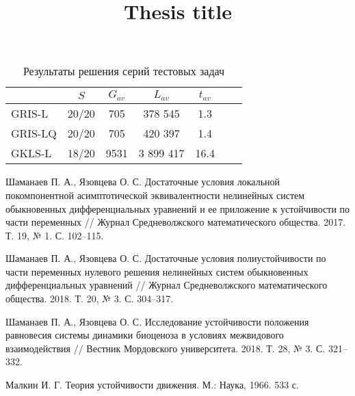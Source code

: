 \documentclass[11pt, oneside, a4paper]{article}
\begin{document}
\begin{table}[ht]
	\caption{Результаты решения серий тестовых задач}
	\label{tab1}
	\begin{center}
		\begin{tabular}{ l c c c c c c } \hline
		 & $S$ &  $G_{av}$ &  $L_{av}$ & $t_{av}$ \\
    \hline
		GRIS-L & 20/20  & 705 &  378 545 & 1.3 \\
		GRIS-LQ & 20/20 & 705 &  420 397 & 1.4 \\
		GKLS-L & 18/20 & 9531 &  3 899 417 & 16.4 \\
		\hline
		\end{tabular}
	\end{center}
\end{table}

\begin{biblio}

 Шаманаев П. А., Язовцева О. С. Достаточные условия локальной покомпонентной асимптотической эквивалентности нелинейных систем обыкновенных дифференциальных уравнений и ее приложение к устойчивости по части переменных // Журнал Средневолжского математического общества. 2017. Т. 19, № 1. С. 102--115.

 Шаманаев П. А., Язовцева О. С. Достаточные условия полиустойчивости по части переменных нулевого решения нелинейных систем обыкновенных дифференциальных уравнений // Журнал Средневолжского математического общества.  2018. Т. 20, № 3. С. 304--317.

 Шаманаев П. А., Язовцева О. С. Исследование устойчивости положения равновесия системы динамики биоценоза в условиях межвидового взаимодействия // Вестник Мордовского университета. 2018. Т. 28, № 3. С. 321–332.

 Малкин И. Г. Теория устойчивости движения. М.: Наука, 1966. 533 с.

\end{biblio}

\title{Thesis title}

\end{document}
